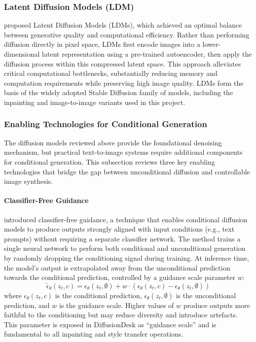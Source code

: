 \documentclass[12pt,a4paper]{report}
\begin{document}
\subsubsection{Latent Diffusion Models (LDM)}

\citet{rombach2022ldm} proposed Latent Diffusion Models (LDMs), which achieved an optimal balance between generative quality and computational efficiency. Rather than performing diffusion directly in pixel space, LDMs first encode images into a lower-dimensional latent representation using a pre-trained autoencoder, then apply the diffusion process within this compressed latent space. This approach alleviates critical computational bottlenecks, substantially reducing memory and computation requirements while preserving high image quality. LDMs form the basis of the widely adopted Stable Diffusion family of models, including the inpainting and image-to-image variants used in this project.

\subsubsection{Enabling Technologies for Conditional Generation}

The diffusion models reviewed above provide the foundational denoising mechanism, but practical text-to-image systems require additional components for conditional generation. This subsection reviews three key enabling technologies that bridge the gap between unconditional diffusion and controllable image synthesis.

\paragraph{Classifier-Free Guidance}

\citet{ho2022cfg} introduced classifier-free guidance, a technique that enables conditional diffusion models to produce outputs strongly aligned with input conditions (e.g., text prompts) without requiring a separate classifier network. The method trains a single neural network to perform both conditional and unconditional generation by randomly dropping the conditioning signal during training. At inference time, the model's output is extrapolated away from the unconditional prediction towards the conditional prediction, controlled by a guidance scale parameter $w$:
\begin{equation}
\tilde{\epsilon}_\theta(z_t, c) = \epsilon_\theta(z_t, \emptyset) + w \cdot (\epsilon_\theta(z_t, c) - \epsilon_\theta(z_t, \emptyset))
\end{equation}
where $\epsilon_\theta(z_t, c)$ is the conditional prediction, $\epsilon_\theta(z_t, \emptyset)$ is the unconditional prediction, and $w$ is the guidance scale. Higher values of $w$ produce outputs more faithful to the conditioning but may reduce diversity and introduce artefacts. This parameter is exposed in DiffusionDesk as ``guidance scale'' and is fundamental to all inpainting and style transfer operations.
\end{document}
